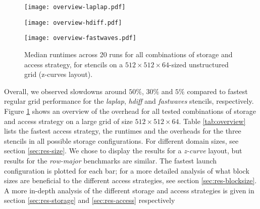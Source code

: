 \begin{figure}
	\begin{center}
	    \texttt{[image: overview-laplap.pdf]}
    
	    \vspace{0.5cm}
    
	    \texttt{[image: overview-hdiff.pdf]}
    
	    \vspace{0.5cm}
    
	    \texttt{[image: overview-fastwaves.pdf]}
		
    \end{center}
    \caption{\label{fig:storage-access} Median runtimes across 20 runs for all combinations of storage and access strategy, for stencils on a $512\times512\times 64$-sized unstructured grid (z-curves layout).}
\end{figure}

Overall, we observed slowdowns around $50\%$, $30\%$ and $5\%$ compared to fastest regular grid performance for the \emph{laplap}, \emph{hdiff} and \emph{fastwaves} stencils, respectively. Figure \ref{fig:storage-access} shows an overview of the overhead for all tested combinations of storage and access strategy on a large grid of size $512\times 512\times 64$. Table \ref{tab:overview} lists the fastest access strategy, the runtimes and the overheads for the three stencils in all possible storage configurations. For different domain sizes, see section \ref{sec:res-size}. We chose to display the results for a \emph{z-curve} layout, but results for the \emph{row-major} benchmarks are similar. The fastest launch configuration is plotted for each bar; for a more detailed analysis of what block sizes are beneficial to the different access strategies, see section \ref{sec:res-blocksize}. A more in-depth analysis of the different storage and access strategies is given in section \ref{sec:res-storage} and \ref{sec:res-access} respectively

